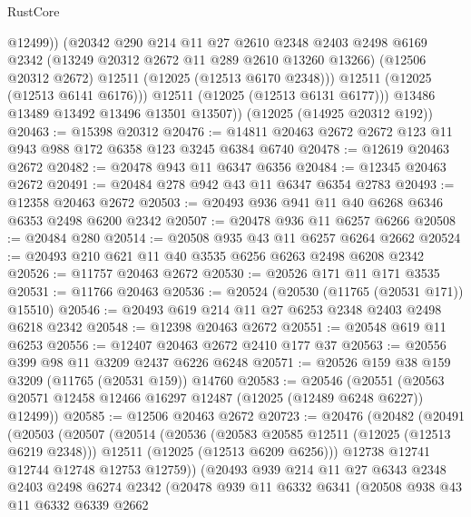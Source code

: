 \begin{lexlean}{RustCore}
\begin{coremodule}
                @12499))
            (@20342
              @290
              @214
              @11
              @27
              @2610
              @2348
              @2403
              @2498
              @6169
              @2342
              (@13249 @20312 @2672 @11 @289 @2610 @13260 @13266)
              (@12506 @20312 @2672)
              @12511
              (@12025 (@12513 @6170 @2348)))
            @12511
            (@12025 (@12513 @6141 @6176)))
          @12511
          (@12025 (@12513 @6131 @6177)))
        @13486
        @13489
        @13492
        @13496
        @13501
        @13507))
    (@12025 (@14925 @20312 @192))
@20463 := @15398 @20312
@20476 := @14811 @20463 @2672 @2672 @123 @11 @943 @988 @172 @6358 @123 @3245 @6384 @6740
@20478 := @12619 @20463 @2672
@20482 := @20478 @943 @11 @6347 @6356
@20484 := @12345 @20463 @2672
@20491 := @20484 @278 @942 @43 @11 @6347 @6354 @2783
@20493 := @12358 @20463 @2672
@20503 := @20493 @936 @941 @11 @40 @6268 @6346 @6353 @2498 @6200 @2342
@20507 := @20478 @936 @11 @6257 @6266
@20508 := @20484 @280
@20514 := @20508 @935 @43 @11 @6257 @6264 @2662
@20524 := @20493 @210 @621 @11 @40 @3535 @6256 @6263 @2498 @6208 @2342
@20526 := @11757 @20463 @2672
@20530 := @20526 @171 @11 @171 @3535
@20531 := @11766 @20463
@20536 := @20524 (@20530 (@11765 (@20531 @171)) @15510)
@20546 := @20493 @619 @214 @11 @27 @6253 @2348 @2403 @2498 @6218 @2342
@20548 := @12398 @20463 @2672
@20551 := @20548 @619 @11 @6253
@20556 := @12407 @20463 @2672 @2410 @177 @37
@20563 := @20556 @399 @98 @11 @3209 @2437 @6226 @6248
@20571 := @20526 @159 @38 @159 @3209 (@11765 (@20531 @159)) @14760
@20583 := @20546
    (@20551 (@20563 @20571 @12458 @12466 @16297 @12487 (@12025 (@12489 @6248 @6227)) @12499))
@20585 := @12506 @20463 @2672
@20723 := @20476
    (@20482
      (@20491
        (@20503
          (@20507
            (@20514
              (@20536
                (@20583 @20585 @12511 (@12025 (@12513 @6219 @2348)))
                @12511
                (@12025 (@12513 @6209 @6256)))
              @12738
              @12741
              @12744
              @12748
              @12753
              @12759))
          (@20493
            @939
            @214
            @11
            @27
            @6343
            @2348
            @2403
            @2498
            @6274
            @2342
            (@20478
              @939
              @11
              @6332
              @6341
              (@20508
                @938
                @43
                @11
                @6332
                @6339
                @2662

\end{coremodule}
\end{lexlean}
